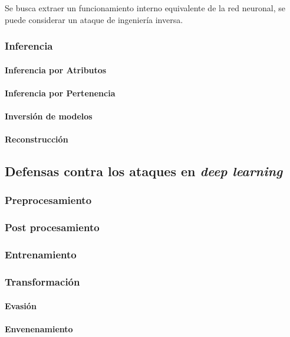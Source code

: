Se busca extraer un funcionamiento interno equivalente de la red neuronal, se puede considerar un ataque de ingeniería inversa.

% 
\subsubsection{Inferencia}

\paragraph{Inferencia por Atributos}
\paragraph{Inferencia por Pertenencia}
\paragraph{Inversión de modelos}
\paragraph{Reconstrucción}


\subsection{Defensas contra los ataques en \textit{deep learning}}
\subsubsection{Preprocesamiento}
\subsubsection{Post procesamiento}
\subsubsection{Entrenamiento}
\subsubsection{Transformación}
\paragraph{Evasión}
\paragraph{Envenenamiento}
